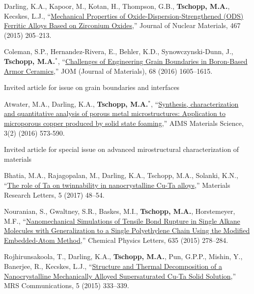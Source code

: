 \begin{cvlist}
\item
Darling, K.A., Kapoor, M., Kotan, H., Thompson, G.B., \textbf{Tschopp, M.A.}, Kecskes, L.J., ``\href{http://dx.doi.org/10.1016/j.jnucmat.2015.09.011}{Mechanical Properties of Oxide-Dispersion-Strengthened (ODS) Ferritic Alloys Based on Zirconium Oxides},'' Journal of Nuclear Materials, 467 (2015) 205--213.

\item
{Coleman, S.P.}, {Hernandez-Rivera, E.}, Behler, K.D., Synowczynski-Dunn, J., \textbf{Tschopp, M.A.}$^\ast$, ``\href{http://dx.doi.org/10.1007/s11837-016-1856-7}{Challenges of Engineering Grain Boundaries in Boron-Based Armor Ceramics},'' JOM (Journal of Materials), 68 (2016) 1605--1615.
\begin{list2}
\item[$\star$] Invited article for issue on grain boundaries and interfaces
\end{list2}

\item
Atwater, M.A., Darling, K.A., \textbf{Tschopp, M.A.}$^\ast$, ``\href{http://dx.doi.org/10.3934/matersci.2016.2.573}{Synthesis, characterization and quantitative analysis of porous metal microstructures: Application to microporous copper produced by solid state foaming},'' AIMS Materials Science, 3(2) (2016) 573-590.
\begin{list2}
\item[$\star$] Invited article for special issue on advanced mirostructural characterization of materials
\end{list2}

\item
Bhatia, M.A., Rajagopalan, M., Darling, K.A., Tschopp, M.A., Solanki, K.N., ``\href{http://dx.doi.org/10.1080/21663831.2016.1201160}{The role of Ta on twinnability in nanocrystalline Cu-Ta alloys},'' Materials Research Letters, 5 (2017) 48--54.

\item
Nouranian, S., Gwaltney, S.R., Baskes, M.I., \textbf{Tschopp, M.A.}, Horstemeyer, M.F., ``\href{http://dx.doi.org/10.1016/j.cplett.2015.06.071}{Nanomechanical Simulations of Tensile Bond Rupture in Single Alkane Molecules with Generalization to a Single Polyethylene Chain Using the Modified Embedded-Atom Method},'' Chemical Physics Letters, 635 (2015) 278--284.

\item
Rojhirunsakoola, T., Darling, K.A., \textbf{Tschopp, M.A.}, Pun, G.P.P., Mishin, Y., Banerjee, R., Kecskes, L.J., ``\href{http://dx.doi.org/10.1557/mrc.2015.34}{Structure and Thermal Decomposition of a Nanocrystalline Mechanically Alloyed Supersaturated Cu-Ta Solid Solution},'' MRS Communications, 5 (2015) 333--339.


\end{cvlist}

